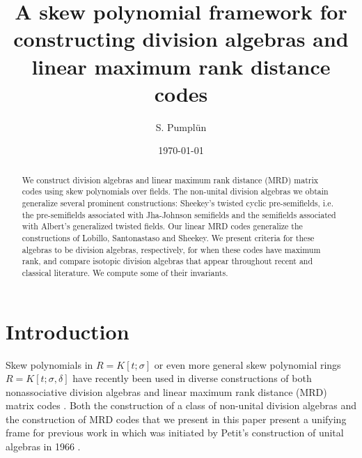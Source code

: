 \documentclass[12pt]{amsart}
\theoremstyle{plain}
\theoremstyle{definition}
\numberwithin{equation}{section}
\numberwithin{figure}{section}
\begin{document}
\title[Division algebras and linear maximum rank distance  codes]
{A skew polynomial framework for constructing division algebras and linear maximum rank distance  codes}



\author{S. Pumpl\"un}




\address{School of Mathematical Sciences\\
University of Nottingham\\ University Park\\ Nottingham NG7 2RD\\
United Kingdom }





\maketitle
\date{\today}


\begin{abstract}
We construct division algebras and linear maximum rank distance (MRD) matrix codes using skew polynomials over fields.  The non-unital division algebras we obtain  generalize several prominent constructions: Sheekey's twisted cyclic pre-semifields, i.e. the pre-semifields associated  with Jha-Johnson semifields and the semifields associated with Albert's generalized twisted fields.
   Our linear MRD codes generalize the constructions of Lobillo, Santonastaso and Sheekey. We  present criteria for these algebras to be division algebras, respectively, for when these codes have maximum rank, and compare isotopic division algebras that appear throughout recent and classical literature.  We compute some of their invariants.
\end{abstract}



\section{Introduction}


Skew polynomials in  $R= K[t;\sigma]$ or even more general skew polynomial rings $R= K[t;\sigma,\delta]$ have recently been  used in diverse constructions of both nonassociative division algebras \cite{LS, NewS, PT2} and  linear  maximum rank distance (MRD) matrix codes \cite{NewS, Sheekey16,  Sheekey, PT2, DT2020, LTZ}.  Both the construction of a class of non-unital division algebras and the construction of MRD codes that we present in this paper present a unifying frame for previous work in
\cite{NewS, PT2, Sheekey} which was initiated by Petit's construction of unital algebras in 1966 \cite{P66}.
\end{document}
